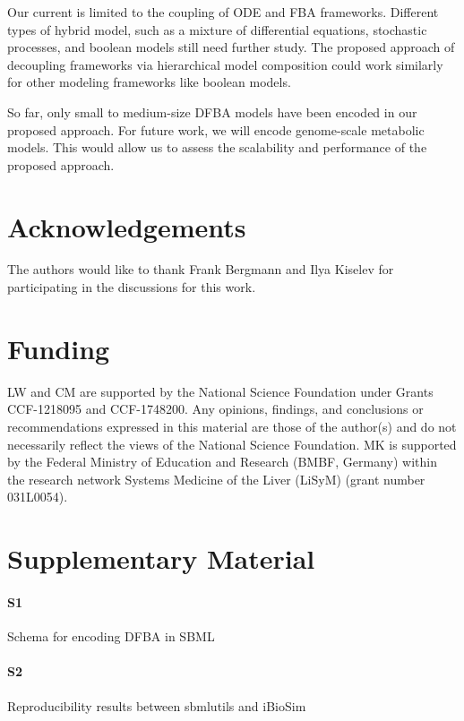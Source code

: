 \documentclass{bioinfo}
\begin{document}
Our current is limited to the coupling of ODE and FBA frameworks. Different types of hybrid model, such as a mixture of differential equations, stochastic processes, and boolean models still need further study. The proposed approach of decoupling frameworks via hierarchical model composition could work similarly for other modeling frameworks like boolean models.

So far, only small to medium-size DFBA models have been encoded in our proposed approach. For future work, we will encode genome-scale metabolic models. This would allow us to assess the scalability and performance of the proposed approach.

\section*{Acknowledgements}
The authors would like to thank Frank Bergmann and Ilya Kiselev for participating in the discussions for this work.

\section*{Funding}
LW and CM are supported by the National Science Foundation under Grants CCF-1218095 and CCF-1748200. Any opinions, findings, and conclusions or recommendations expressed in this material are those of the author(s) and do not necessarily reflect the views of the National Science Foundation. MK is supported by the Federal Ministry of Education and Research (BMBF, Germany) within the research network Systems Medicine of the Liver (LiSyM) (grant number 031L0054). 

\section*{Supplementary Material}
\paragraph*{S1} \label{sup:guidelines} Schema for encoding DFBA in SBML
\paragraph*{S2} \label{sup:reproducibility} Reproducibility results between sbmlutils and iBioSim
\end{document}
